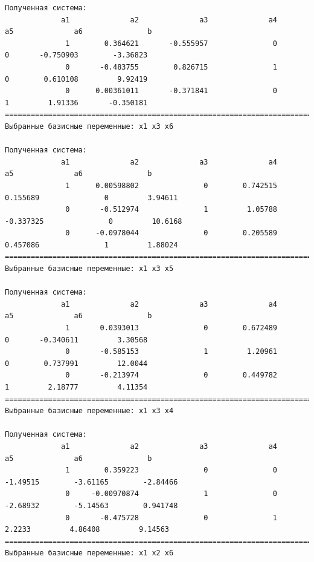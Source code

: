 \documentclass[a4paper,14pt]{extarticle}
\begin{document}
\begin{verbatim}
Полученная система:
             a1              a2              a3              a4              a5              a6               b
              1        0.364621       -0.555957               0               0       -0.750903        -3.36823
              0       -0.483755        0.826715               1               0        0.610108         9.92419
              0      0.00361011       -0.371841               0               1         1.91336       -0.350181
==================================================================================================================
Выбранные базисные переменные: x1 x3 x6

Полученная система:
             a1              a2              a3              a4              a5              a6               b
              1      0.00598802               0        0.742515        0.155689               0         3.94611
              0       -0.512974               1         1.05788       -0.337325               0         10.6168
              0      -0.0978044               0        0.205589        0.457086               1         1.88024
==================================================================================================================
Выбранные базисные переменные: x1 x3 x5

Полученная система:
             a1              a2              a3              a4              a5              a6               b
              1       0.0393013               0        0.672489               0       -0.340611         3.30568
              0       -0.585153               1         1.20961               0        0.737991         12.0044
              0       -0.213974               0        0.449782               1         2.18777         4.11354
==================================================================================================================
Выбранные базисные переменные: x1 x3 x4

Полученная система:
             a1              a2              a3              a4              a5              a6               b
              1        0.359223               0               0        -1.49515        -3.61165        -2.84466
              0     -0.00970874               1               0        -2.68932        -5.14563        0.941748
              0       -0.475728               0               1          2.2233         4.86408         9.14563
==================================================================================================================
Выбранные базисные переменные: x1 x2 x6 


\end{verbatim}
\end{document}
